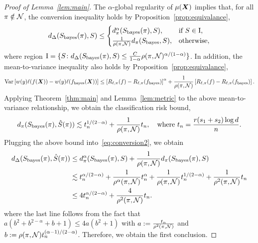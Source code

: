 \documentclass[11pt]{article}
\theoremstyle{plain}
\theoremstyle{definition}
\def\bayesf{f_{\textup{bayes}}}
\def\bayesS{S_{\textup{bayes}}}
\begin{document}
\begin{proof}[Proof of Lemma~\ref{lem:main}] The $\alpha$-global regularity of $\mu(\bm X)$ implies that, for all $\pi \notin \mathcal{N}$, the conversion inequality holds by Proposition~\ref{prop:equivalance},
\begin{equation}\label{eq:conversion2}
d_{\Delta}(\bayesS(\pi),S) \leq
\begin{cases}
d^\alpha_{\pi}(\bayesS(\pi),S), & \text{if }S\in \textup{I},\\
{1\over \rho(\pi, \tN)}d_{\pi}(\bayesS,S),& \text{otherwise},
\end{cases}
\end{equation}
where region  $\textup{I}=\{S \colon d_{\Delta}(\bayesS(\pi),S)\leq \frac	{C}{1-\alpha}\rho(\pi,\tN)^{\alpha/(1-\alpha)}\}$.
In addition,  the mean-to-variance inequality also holds by Proposition~\ref{prop:equivalance},
\begin{equation}
\text{Var}\left[w(y)\ell(f(\mX)) - w(y)\ell(\bayesf(\mX))\right] \leq \left[R_{\ell,\pi}(f)-R_{\ell,\pi}(\bayesf)\right]^{\alpha}+ {1\over \rho(\pi, \tN)}\left[R_{\ell,\pi}(f)-R_{\ell,\pi}(\bayesf)\right].
\end{equation}
Applying Theorem~\ref{thm:main} and Lemma~\ref{lem:metric} to the above mean-to-variance relationship, we obtain the classification risk bound,
\begin{align}
d_\pi(\bayesS(\pi), \hat S(\pi))\lesssim t_n^{1/(2-\alpha)}+ {1\over \rho(\pi, \tN)}t_n,\quad \text{where}\ t_n={r(s_1+s_2)\log d  \over n}.
\end{align}
Plugging the above bound into~\eqref{eq:conversion2}, we obtain
\begin{align}
d_{\Delta}(\bayesS(\pi),\hat S(\pi)) &\leq d^\alpha_{\pi}(\bayesS(\pi),S)+{1\over \rho(\pi, \tN)}d_{\pi}(\bayesS(\pi),S)\\
&\lesssim t_n^{\alpha/(2-\alpha)}+{1\over \rho^{\alpha}(\pi, \tN)}t_n^{\alpha}+{1\over \rho(\pi, \tN)}t_n^{1/(2-\alpha)}+{1\over \rho^2(\pi, \tN)}t_n\\
&\leq 4t_n^{\alpha/(2-\alpha)}+{4\over \rho^2(\pi, \tN)}t_n.
\end{align}
where the last line follows from the fact that $a(b^2+b^{2-\alpha}+b+1) \leq 4 a (b^2+1)$ with $a:={t_n \over \rho^2(\pi, \mathcal{N})}$ and $b:=\rho(\pi, \mathcal{N}) t_n^{(\alpha-1)/(2-\alpha)}$.  Therefore,  we obtain the first conclusion.



\end{proof}
\end{document}
